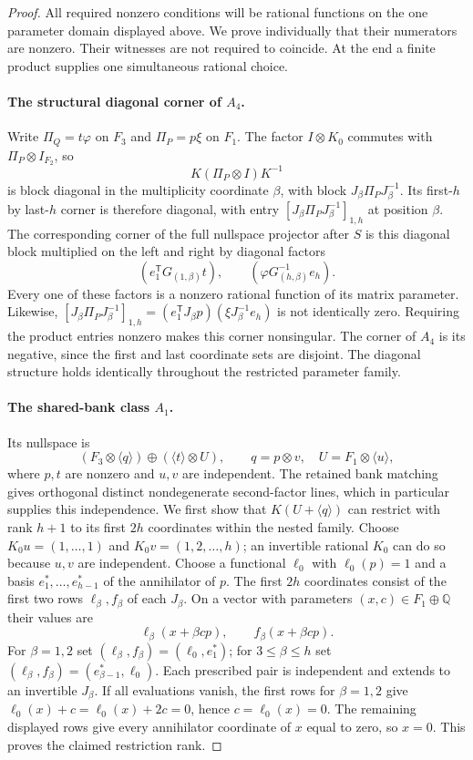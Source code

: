 \begin{proof}
All required nonzero conditions will be rational functions on the one
parameter domain displayed above. We prove individually that their
numerators are nonzero. Their witnesses are not required to coincide.
At the end a finite product supplies one simultaneous rational choice.

\paragraph{The structural diagonal corner of $A_4$.}
Write $\Pi_Q=t\varphi$ on $F_3$ and $\Pi_P=p\xi$ on $F_1$.
The factor $I\otimes K_0$ commutes with $\Pi_P\otimes I_{F_2}$, so
\[
 K(\Pi_P\otimes I)K^{-1}
\]
is block diagonal in the multiplicity coordinate $\beta$, with block
$J_\beta\Pi_PJ_\beta^{-1}$. Its first-$h$ by last-$h$ corner is
therefore diagonal, with entry
$[J_\beta\Pi_PJ_\beta^{-1}]_{1,h}$ at position $\beta$.
The corresponding corner of the full nullspace projector after $S$ is
this diagonal block multiplied on the left and right by diagonal factors
\[
 (e_1^{\mathsf T}G_{(1,\beta)}t),\qquad
 (\varphi G_{(h,\beta)}^{-1}e_h).
\]
Every one of these factors is a nonzero rational function of its matrix
parameter. Likewise,
$[J_\beta\Pi_PJ_\beta^{-1}]_{1,h}
 =(e_1^{\mathsf T}J_\beta p)(\xi J_\beta^{-1}e_h)$
is not identically zero. Requiring the product entries nonzero makes
this corner nonsingular. The corner of $A_4$ is its negative, since the
first and last coordinate sets are disjoint. The diagonal structure holds
identically throughout the restricted parameter family.

\paragraph{The shared-bank class $A_1$.}
Its nullspace is
\[
 (F_3\otimes\langle q\rangle)\mathbin\oplus
   (\langle t\rangle\otimes U),
 \qquad q=p\otimes v,\quad U=F_1\otimes\langle u\rangle,
\]
where $p,t$ are nonzero and $u,v$ are independent. The retained bank
matching gives orthogonal distinct nondegenerate second-factor lines,
which in particular supplies this independence.
We first show that $K(U+\langle q\rangle)$ can restrict with rank $h+1$
to its first $2h$ coordinates within the nested family.
Choose $K_0u=(1,\ldots,1)$ and $K_0v=(1,2,\ldots,h)$; an invertible
rational $K_0$ can do so because $u,v$ are independent. Choose a functional
$\ell_0$ with $\ell_0(p)=1$ and a basis
$e_1^*,\ldots,e_{h-1}^*$ of the annihilator of $p$.
The first $2h$ coordinates consist of the first two rows
$\ell_\beta,f_\beta$ of each $J_\beta$. On a vector with parameters
$(x,c)\in F_1\oplus\mathbb Q$ their values are
\[
 \ell_\beta(x+\beta c p),\qquad f_\beta(x+\beta c p).
\]
For $\beta=1,2$ set $(\ell_\beta,f_\beta)=(\ell_0,e_1^*)$;
for $3\le\beta\le h$ set
$(\ell_\beta,f_\beta)=(e_{\beta-1}^*,\ell_0)$.
Each prescribed pair is independent and extends to an invertible
$J_\beta$. If all evaluations vanish, the first rows for $\beta=1,2$
give $\ell_0(x)+c=\ell_0(x)+2c=0$, hence $c=\ell_0(x)=0$.
The remaining displayed rows give every annihilator coordinate of $x$
equal to zero, so $x=0$. This proves the claimed restriction rank.


\end{proof}
